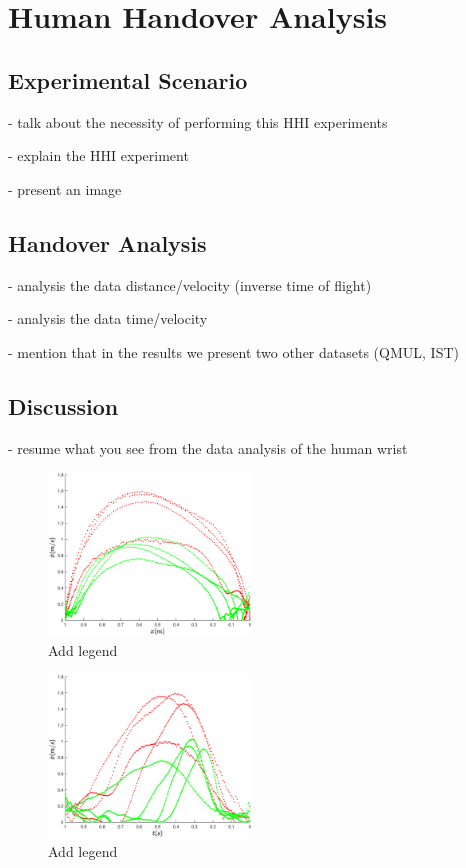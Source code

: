 \section{Human Handover Analysis}

\subsection{Experimental Scenario}
- talk about the necessity of performing this HHI experiments 

- explain the HHI experiment

- present an image

\subsection{Handover Analysis}

- analysis the data distance/velocity (inverse time of flight)

- analysis the data time/velocity

- mention that in the results we present two other datasets (QMUL, IST)

\subsection{Discussion}

- resume what you see from the data analysis of the human wrist

    \begin{figure}[t]
      \centering
      \includegraphics[width = 0.48\textwidth]{Images/vel_distance_plot.eps}
      \caption{Add legend} 
      \label{fig:vel_distance}
	\end{figure}
	
	
    \begin{figure}[t]
      \centering
      \includegraphics[width = 0.48\textwidth]{Images/vel_time_plot.eps}
      \caption{Add legend} 
      \label{fig:vel_time}
	\end{figure}
	